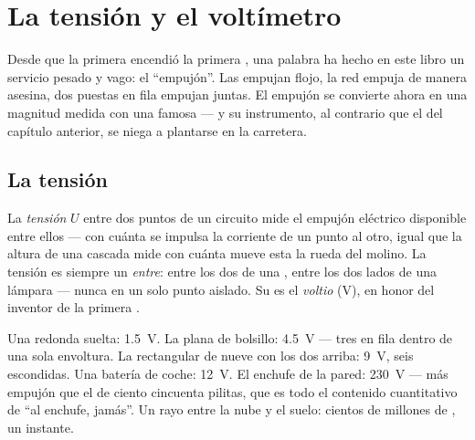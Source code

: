 \chapter{La tensión y el voltímetro}\label{ch:g8:voltage-voltmeter}

Desde que la primera  encendió la primera
, una palabra ha hecho en este libro un servicio pesado y
vago: el ``empujón''. Las  empujan flojo, la red empuja de manera
asesina, dos  puestas en fila empujan juntas. El empujón se
convierte ahora en una magnitud medida con una  famosa --- y
su instrumento, al contrario que el del capítulo anterior, se niega a
plantarse en la carretera.

\section{La tensión}

\begin{definition}[Tensión]\label{def:g8:voltage-voltmeter:voltage}
La \emph{tensión} $U$ entre dos puntos de un circuito
mide el empujón eléctrico disponible entre ellos --- con cuánta
 se impulsa la corriente de un punto al otro, igual que la altura
de una cascada mide con cuánta  mueve esta la rueda del
molino. La tensión es siempre un \emph{entre}: entre los dos
 de una , entre los dos lados de una lámpara
--- nunca en un solo punto aislado. Su  es el
\emph{voltio} (\unit{V}), en honor del inventor de la
primera .
\end{definition}

\begin{example}\label{ex:g8:voltage-voltmeter:values}
Una  redonda suelta: \qty{1.5}{V}. La  plana de
bolsillo: \qty{4.5}{V} --- tres  en fila dentro de una sola
envoltura. La rectangular de nueve  con los dos
 arriba: \qty{9}{V}, seis  escondidas. Una
batería de coche: \qty{12}{V}. El enchufe de la pared:
\qty{230}{V} --- más empujón que el de ciento cincuenta pilitas, que es
todo el contenido cuantitativo de ``al enchufe, jamás''. Un rayo entre
la nube y el suelo: cientos de millones de , un instante.
\end{example}

